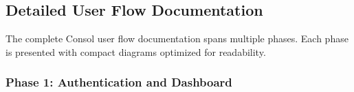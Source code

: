 
\clearpage
\subsection{Detailed User Flow Documentation}

The complete Consol user flow documentation spans multiple phases. Each phase is presented with compact diagrams optimized for readability.

\subsubsection{Phase 1: Authentication and Dashboard}

